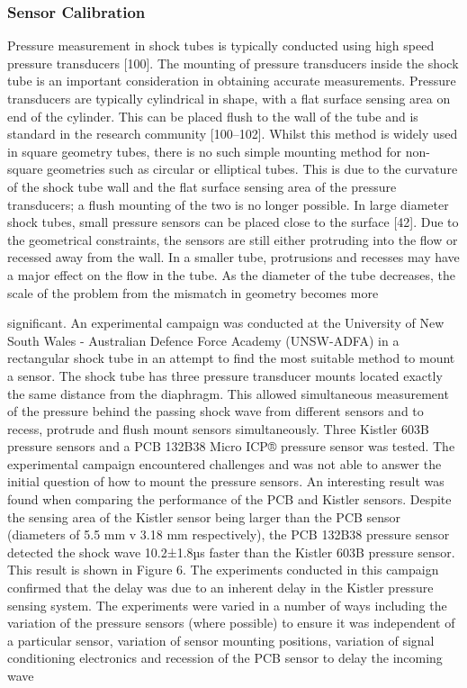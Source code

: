 \subsubsection{Sensor Calibration}
\cite{knight1958piezoelectric}
\cite{knight1958piezoelectric, anderson2000shock,ryu1995shock} 
Pressure measurement in shock tubes is typically conducted using high speed pressure transducers [100]. The
mounting of pressure transducers inside the shock tube is an important consideration in obtaining accurate
measurements. Pressure transducers are typically cylindrical in shape, with a flat surface sensing area on end
of the cylinder. This can be placed flush to the wall of the tube and is standard in the research community
[100–102]. Whilst this method is widely used in square geometry tubes, there is no such simple mounting
method for non-square geometries such as circular or elliptical tubes. This is due to the curvature of the shock
tube wall and the flat surface sensing area of the pressure transducers; a flush mounting of the two is no longer
possible. In large diameter shock tubes, small pressure sensors can be placed close to the surface [42]. Due
to the geometrical constraints, the sensors are still either protruding into the flow or recessed away from
the wall. In a smaller tube, protrusions and recesses may have a major effect on the flow in the tube. As
the diameter of the tube decreases, the scale of the problem from the mismatch in geometry becomes more

significant.
An experimental campaign was conducted at the University of New South Wales - Australian Defence
Force Academy (UNSW-ADFA) in a rectangular shock tube in an attempt to find the most suitable method
to mount a sensor. The shock tube has three pressure transducer mounts located exactly the same distance
from the diaphragm. This allowed simultaneous measurement of the pressure behind the passing shock wave
from different sensors and to recess, protrude and flush mount sensors simultaneously. Three Kistler 603B
pressure sensors and a PCB 132B38 Micro ICP® pressure sensor was tested.
The experimental campaign encountered challenges and was not able to answer the initial question of
how to mount the pressure sensors. An interesting result was found when comparing the performance of the
PCB and Kistler sensors. Despite the sensing area of the Kistler sensor being larger than the PCB sensor
(diameters of 5.5 mm v 3.18 mm respectively), the PCB 132B38 pressure sensor detected the shock wave
10.2±1.8µs faster than the Kistler 603B pressure sensor. This result is shown in Figure 6. The experiments
conducted in this campaign confirmed that the delay was due to an inherent delay in the Kistler pressure
sensing system. The experiments were varied in a number of ways including the variation of the pressure
sensors (where possible) to ensure it was independent of a particular sensor, variation of sensor mounting
positions, variation of signal conditioning electronics and recession of the PCB sensor to delay the incoming
wave

